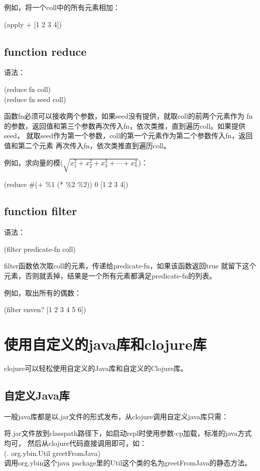 ﻿\documentclass[a4paper,11pt]{article}
\begin{document}
  例如，将一个coll中的所有元素相加：\par
  (apply + [1 2 3 4])
  
  \subsection[function reduce]{function reduce}
  语法：\par
  (reduce fn coll)\\
  (reduce fn seed coll)

  函数fn必须可以接收两个参数，如果seed没有提供，就取coll的前两个元素作为
  fn的参数，返回值和第三个参数再次传入fn，依次类推，直到遍历coll。如果提供seed，
  就取seed作为第一个参数，coll的第一个元素作为第二个参数传入fn，返回值和第二个元素
  再次传入fn，依次类推直到遍历coll。

  例如，求向量的模($\sqrt{x_1^2+x_2^2+x_3^3+\cdots+x_n^2}$)：\par
  (reduce \#(+ \%1 (* \%2 \%2)) 0 [1 2 3 4])
  
  \subsection[function filter]{function filter}
  语法：\par
  (filter predicate-fn coll)

  filter函数依次取coll的元素，传递给predicate-fn，如果该函数返回true
  就留下这个元素，否则就丢掉，结果是一个所有元素都满足predicate-fn的列表。

  例如，取出所有的偶数：\par
  (filter enven? [1 2 3 4 5 6])

  \section[使用自定义的java库和clojure库]{使用自定义的java库和clojure库}
  clojure可以轻松使用自定义的Java库和自定义的Clojure库。
  \subsection[自定义Java库]{自定义Java库}
  一般java库都是以.jar文件的形式发布，从clojure调用自定义java库只需：

  将.jar文件放到classpath路径下，如启动repl时使用参数-cp加载，标准的java方式均可，
  然后从clojure代码直接调用即可，如：\\
  (. org.ybin.Util greetFromJava)\\
  调用org.ybin这个java package里的Util这个类的名为greetFromJava的静态方法。
\end{document}
